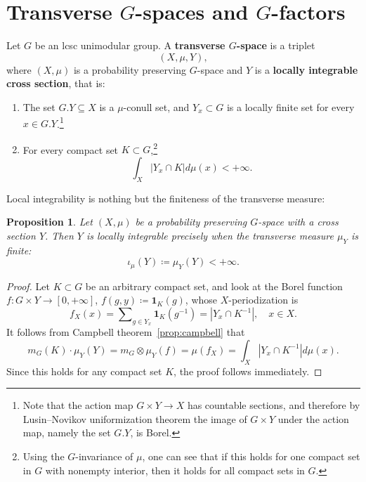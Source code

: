 \documentclass{amsart}
\numberwithin{equation}{subsection}
\newtheorem{prop}[thm]{Proposition}
\theoremstyle{remark}
\begin{document}
\section{Transverse \(G\)-spaces and \(G\)-factors}

Let \(G\) be an lcsc unimodular group. A {\bf transverse \(G\)-space} is a triplet
\[\left(X,\mu,Y\right),\]
where \(\left(X,\mu\right)\) is a probability preserving \(G\)-space and \(Y\) is a {\bf locally integrable cross section}, that is:
\begin{enumerate}
    \item The set \(G.Y\subseteq X\) is a \(\mu\)-conull set, and \(Y_{x}\subset G\) is a locally finite set for every \(x\in G.Y\).\footnote{Note that the action map \(G\times Y\to X\) has countable sections, and therefore by Lusin--Novikov uniformization theorem the image of \(G\times Y\) under the action map, namely the set \(G.Y\), is Borel.}
    \item For every compact set \(K\subset G\),\footnote{Using the \(G\)-invariance of \(\mu\), one can see that if this holds for one compact set in \(G\) with nonempty interior, then it holds for all compact sets in \(G\).}
    \[\int_{X}\left|Y_{x}\cap K\right|d\mu\left(x\right)<+\infty.\]
\end{enumerate}

Local integrability is nothing but the finiteness of the transverse measure:

\begin{prop}\label{prop:intensityli}
Let \(\left(X,\mu\right)\) be a probability preserving \(G\)-space with a cross section \(Y\). Then \(Y\) is locally integrable precisely when the transverse measure \(\mu_{Y}\) is finite:
\[\iota_{\mu}\left(Y\right)\coloneqq \mu_{Y}\left(Y\right)<+\infty.\]
\end{prop}

\begin{proof}
Let \(K\subset G\) be an arbitrary compact set, and look at the Borel function \(f:G\times Y\to\left[0,+\infty\right]\), \(f\left(g,y\right)\coloneqq\mathbf{1}_{K}\left(g\right)\), whose \(X\)-periodization is
\[f_{X}\left(x\right)=\sum\nolimits_{g\in Y_{x}}\mathbf{1}_{K}\left(g^{-1}\right)=\left|Y_{x}\cap K^{-1}\right|,\quad x\in X.\]
It follows from Campbell theorem~\ref{prop:campbell} that
\[m_{G}\left(K\right)\cdot\mu_{Y}\left(Y\right)=m_{G}\otimes\mu_{Y}\left(f\right)=\mu\left(f_{X}\right)=\int_{X}\left|Y_{x}\cap K^{-1}\right|d\mu\left(x\right).\]
Since this holds for any compact set \(K\), the proof follows immediately.
\end{proof}
\end{document}
